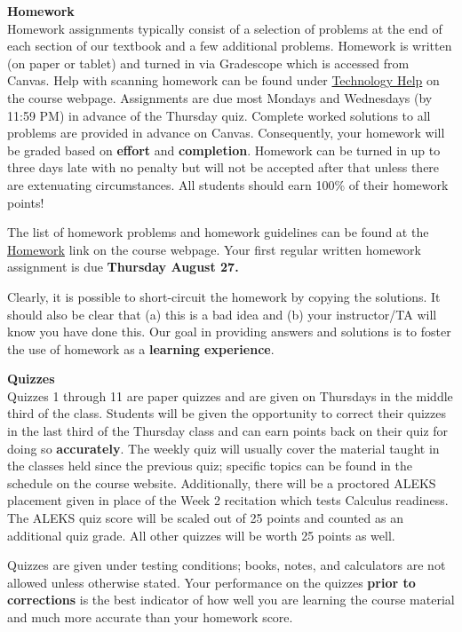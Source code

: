 \documentclass[12pt]{article}
\renewcommand{\emph}[1]{\textsf{\textbf{#1}}}
\newcommand{\localhead}[1]{\par\smallskip\textbf{#1}\nobreak\\}%
\def\heading#1{\localhead{\large\emph{#1}}}
\begin{document}
\heading{Homework}
Homework assignments typically consist of a selection of problems at the end of each section of our textbook and a few additional problems. Homework is written (on paper or tablet) and turned in via Gradescope which is accessed from Canvas.  Help with scanning homework can be found under \href{https://uaf-math.github.io/calc1/techHelp.html}{Technology Help} on the course webpage. Assignments are due most Mondays and Wednesdays (by 11:59 PM) in advance of the Thursday quiz. Complete worked solutions to all problems are provided in advance on Canvas. Consequently, your homework will be graded based on \emph{effort} and \emph{completion}. Homework can be turned in up to three days late with no penalty but will not be accepted after that unless there are extenuating circumstances. All students should earn 100\% of their homework points!

The list of homework problems and homework guidelines can be found at the \href{https://uaf-math.github.io/calc1/newhomework.html}{Homework} link on the course webpage. Your first regular written homework assignment is due \emph{Thursday August 27.}

Clearly, it is possible to short-circuit the homework by copying the solutions. It should also be clear that (a) this is a bad idea and (b) your instructor/TA will know you have done this. Our goal in providing answers and solutions is to foster the use of homework as a \emph{learning experience}. 



\heading{Quizzes}
Quizzes 1 through 11 are paper quizzes and are given on Thursdays in the middle third of the class. Students will be given the opportunity to correct their quizzes in the last third of the Thursday class and can earn points back on their quiz for doing so \emph{accurately}. The weekly quiz will usually cover the material taught in the classes held since the previous quiz; specific topics can be found in the schedule on the course website. Additionally, there will be a proctored ALEKS placement given in place of the Week 2 recitation which tests Calculus readiness. The ALEKS quiz score will be scaled out of 25 points and counted as an additional quiz grade. All other quizzes will be worth 25 points as well.

Quizzes are given under testing conditions; books, notes, and calculators are not allowed unless otherwise stated. Your performance on the quizzes \emph{prior to corrections} is the best indicator of how well you are learning the course material and much more accurate than your homework score.
\end{document}
